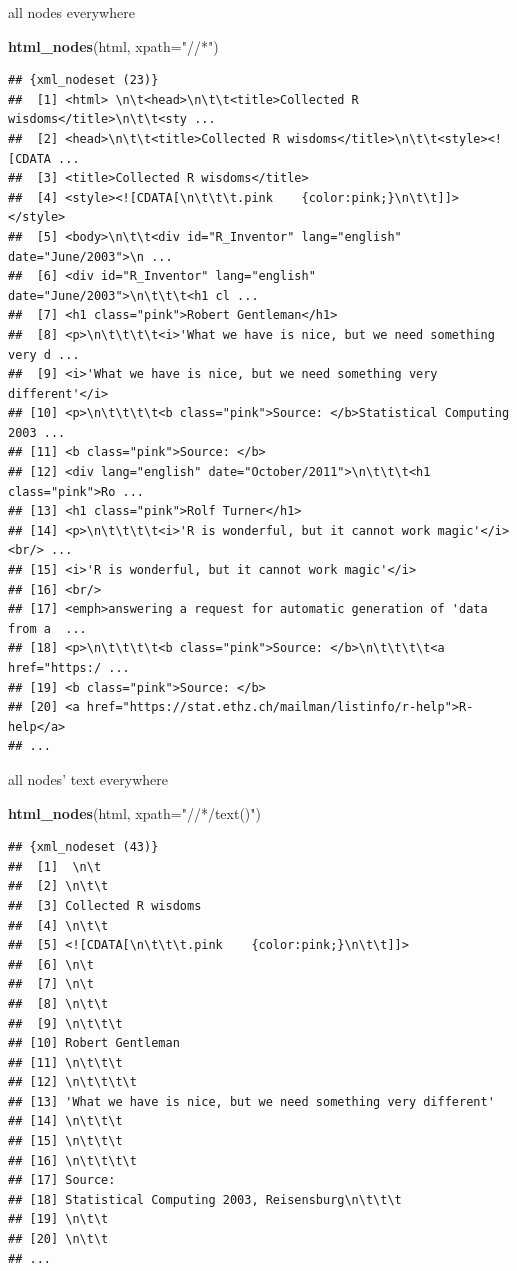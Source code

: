 \documentclass[ignorenonframetext,]{beamer}
\newenvironment{Shaded}{\begin{snugshade}}{\end{snugshade}}
\newcommand{\KeywordTok}[1]{\textcolor[rgb]{0.13,0.29,0.53}{\textbf{{#1}}}}
\newcommand{\DataTypeTok}[1]{\textcolor[rgb]{0.13,0.29,0.53}{{#1}}}
\newcommand{\StringTok}[1]{\textcolor[rgb]{0.31,0.60,0.02}{{#1}}}
\newcommand{\NormalTok}[1]{{#1}}
\begin{document}
\begin{frame}[fragile]{all nodes everywhere}

\begin{Shaded}
\begin{Highlighting}[]
\KeywordTok{html_nodes}\NormalTok{(html, }\DataTypeTok{xpath=}\StringTok{"//*"}\NormalTok{)}
\end{Highlighting}
\end{Shaded}

\begin{verbatim}
## {xml_nodeset (23)}
##  [1] <html> \n\t<head>\n\t\t<title>Collected R wisdoms</title>\n\t\t<sty ...
##  [2] <head>\n\t\t<title>Collected R wisdoms</title>\n\t\t<style><![CDATA ...
##  [3] <title>Collected R wisdoms</title>
##  [4] <style><![CDATA[\n\t\t\t.pink    {color:pink;}\n\t\t]]></style>
##  [5] <body>\n\t\t<div id="R_Inventor" lang="english" date="June/2003">\n ...
##  [6] <div id="R_Inventor" lang="english" date="June/2003">\n\t\t\t<h1 cl ...
##  [7] <h1 class="pink">Robert Gentleman</h1>
##  [8] <p>\n\t\t\t\t<i>'What we have is nice, but we need something very d ...
##  [9] <i>'What we have is nice, but we need something very different'</i>
## [10] <p>\n\t\t\t\t<b class="pink">Source: </b>Statistical Computing 2003 ...
## [11] <b class="pink">Source: </b>
## [12] <div lang="english" date="October/2011">\n\t\t\t<h1 class="pink">Ro ...
## [13] <h1 class="pink">Rolf Turner</h1>
## [14] <p>\n\t\t\t\t<i>'R is wonderful, but it cannot work magic'</i><br/> ...
## [15] <i>'R is wonderful, but it cannot work magic'</i>
## [16] <br/>
## [17] <emph>answering a request for automatic generation of 'data from a  ...
## [18] <p>\n\t\t\t\t<b class="pink">Source: </b>\n\t\t\t\t<a href="https:/ ...
## [19] <b class="pink">Source: </b>
## [20] <a href="https://stat.ethz.ch/mailman/listinfo/r-help">R-help</a>
## ...
\end{verbatim}

\end{frame}

\begin{frame}[fragile]{all nodes' text everywhere}

\begin{Shaded}
\begin{Highlighting}[]
\KeywordTok{html_nodes}\NormalTok{(html, }\DataTypeTok{xpath=}\StringTok{"//*/text()"}\NormalTok{)}
\end{Highlighting}
\end{Shaded}

\begin{verbatim}
## {xml_nodeset (43)}
##  [1]  \n\t
##  [2] \n\t\t
##  [3] Collected R wisdoms
##  [4] \n\t\t
##  [5] <![CDATA[\n\t\t\t.pink    {color:pink;}\n\t\t]]>
##  [6] \n\t
##  [7] \n\t
##  [8] \n\t\t
##  [9] \n\t\t\t
## [10] Robert Gentleman
## [11] \n\t\t\t
## [12] \n\t\t\t\t
## [13] 'What we have is nice, but we need something very different'
## [14] \n\t\t\t
## [15] \n\t\t\t
## [16] \n\t\t\t\t
## [17] Source: 
## [18] Statistical Computing 2003, Reisensburg\n\t\t\t
## [19] \n\t\t
## [20] \n\t\t
## ...
\end{verbatim}

\end{frame}
\end{document}
